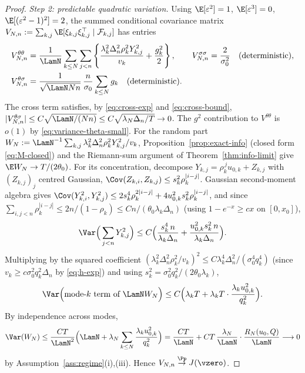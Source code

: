 \begin{proof}
\emph{Step 2: predictable quadratic variation.}
Using $\E[\varepsilon^2]=1$, $\E[\varepsilon^3]=0$, $\E[(\varepsilon^2-1)^2]=2$,
the summed conditional covariance matrix
$V_{N,n}:=\sum_{k,j}\E[\xi_{k,j}\xi_{k,j}^\top\mid\mathcal F_{k,j}]$ has entries
\begin{align}
 V^{\theta\theta}_{N,n}
 &=\frac1{\LamN}\sum_{k\le N}\sum_{j<n}
 \left\{\frac{\lambda_k^2\Delta_n^2\rho_k^2Y_{k,j}^2}{v_k}
 +\frac{g_k^2}{2}\right\},
 \qquad
 V^{\sigma\sigma}_{N,n}
 =\frac{2}{\sigma_0^2}\quad\text{(deterministic)},
 \label{eq:clt-qv}\\
 V^{\theta\sigma}_{N,n}
 &=\frac{1}{\sqrt{\LamN Nn}}\,\frac{n}{\sigma_0}\sum_{k\le N}g_k
 \quad\text{(deterministic)} .\nonumber
\end{align}
The cross term satisfies, by \eqref{eq:cross-exp} and \eqref{eq:cross-bound},
$|V^{\theta\sigma}_{N,n}|\le C\sqrt{\LamN/(Nn)}\le
C\sqrt{\lambda_N\Delta_n/T}\to0$. The $g^2$ contribution to
$V^{\theta\theta}$ is $o(1)$ by \eqref{eq:variance-theta-small}. For the
random part $W_{N}:=\LamN^{-1}\sum_{k,j}\lambda_k^2\Delta_n^2\rho_k^2Y_{k,j}^2/v_k$,
Proposition~\ref{prop:exact-info} (closed form \eqref{eq:M-closed}) and the
Riemann-sum argument of Theorem~\ref{thm:info-limit} give
$\E W_N\to T/(2\theta_0)$. For its concentration, decompose
$Y_{k,j}=\rho_k^{\,j}u_{0,k}+Z_{k,j}$ with $(Z_{k,j})_j$ centred Gaussian,
$\Cov(Z_{k,i},Z_{k,j})\le s_k^2\rho_k^{|i-j|}$. Gaussian second-moment algebra
gives $\Cov(Y_{k,i}^2,Y_{k,j}^2)\le
2s_k^4\rho_k^{2|i-j|}+4u_{0,k}^2s_k^2\rho_k^{|i-j|}$, and since
$\sum_{i,j<n}\rho_k^{|i-j|}\le 2n/(1-\rho_k)\le Cn/(\theta_0\lambda_k\Delta_n)$
(using $1-e^{-x}\ge cx$ on $[0,x_0]$),
\[
 \Var\Big(\sum_{j<n}Y_{k,j}^2\Big)
 \le C\Big(\frac{s_k^4\,n}{\lambda_k\Delta_n}
 +\frac{u_{0,k}^2s_k^2\,n}{\lambda_k\Delta_n}\Big).
\]
Multiplying by the squared coefficient
$(\lambda_k^2\Delta_n^2\rho_k^2/v_k)^2\le C\lambda_k^4\Delta_n^2/(\sigma_0^4q_k^4)$
(since $v_k\ge c\sigma_0^2q_k^2\Delta_n$ by \eqref{eq:h-exp}) and using
$s_k^2=\sigma_0^2q_k^2/(2\theta_0\lambda_k)$,
\[
 \Var\Big(\text{mode-}k\text{ term of }\LamN W_N\Big)
 \le C\Big(\lambda_kT
 +\lambda_kT\cdot\frac{\lambda_ku_{0,k}^2}{q_k^2}\Big).
\]
By independence across modes,
\[
 \Var(W_N)
 \le\frac{C T}{\LamN^2}\Big(\LamN+\lambda_N\sum_{k\le N}
 \frac{\lambda_ku_{0,k}^2}{q_k^2}\Big)
 =\frac{CT}{\LamN}
 +CT\,\frac{\lambda_N}{\LamN}\cdot\frac{R_N(u_0,Q)}{\LamN}
 \longrightarrow0
\]
by Assumption~\ref{ass:regime}(i),(iii). Hence
$V_{N,n}\overset{\Pp}{\to}J(\vzero)$.


\end{proof}
